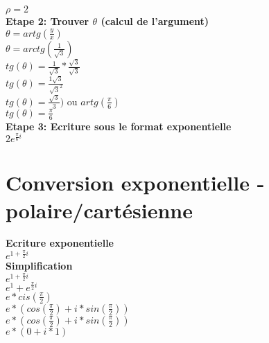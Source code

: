 $\rho = 2$ \\

\vspace{5mm}
\textbf{Etape 2: Trouver $\theta$ (calcul de l'argument)} \\

$\theta = artg(\frac{y}{x})$ \\

$\theta = arctg(\frac{1}{\sqrt{3}})$ \\

$tg(\theta) = \frac{1}{\sqrt{3}} * \frac{\sqrt{3}}{\sqrt{3}}$ \\

$tg(\theta) = \frac{1\sqrt{3}}{\sqrt{3}^{2}}$ \\

$tg(\theta) = \frac{\sqrt{3}}{3})$ ou $artg(\frac{\pi}{6}) $ \\

$tg(\theta) = \frac{\pi}{6} $ \\

\vspace{5mm}
\textbf{Etape 3: Ecriture sous le format exponentielle} \\

$2e^{\frac{\pi}{6}i}$

\newpage
\section{Conversion exponentielle - polaire/cartésienne }
\vspace{3mm} %

\textbf{Ecriture exponentielle} \\

$e^{1+\frac{\pi}{2}i}$ \\

\textbf{Simplification} \\

$e^{1+\frac{\pi}{2}i}$ \\

$e^{1} + e^{\frac{\pi}{2}i}$ \\

$e*cis(\frac{\pi}{2})$ \\

$e*(cos(\frac{\pi}{2}) + i*sin(\frac{\pi}{2})) $ \\

$e*(cos(\frac{\pi}{2}) + i*sin(\frac{\pi}{2})) $ \\

$e*(0 + i*1) $ \\

